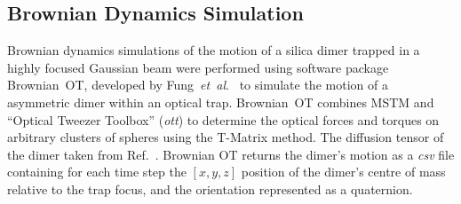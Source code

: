 \documentclass[final,  3p]{elsarticle}
\begin{document}
\subsection{Brownian Dynamics Simulation}
\label{sec:brownian}

Brownian dynamics simulations of the motion of a silica dimer trapped
in a highly focused Gaussian beam were performed using software
package Brownian~OT, developed by Fung~\textit{et~al}.\
\cite{Vigilante2020Brownian_OT} to simulate the motion of a asymmetric
dimer within an optical trap.  Brownian~OT combines MSTM
\cite{Mishchenko1996MSTM} and ``Optical Tweezer Toolbox''
(\textit{ott}) \cite{Lenton2020} to determine the optical forces and
torques on arbitrary clusters of spheres using the T-Matrix method.
%
The diffusion tensor of the dimer taken from Ref.~.
%
%
Brownian OT returns the dimer's motion as a \textit{csv} file
containing for each time step the $[x,y,z]$ position of the dimer's
centre of mass relative to the trap focus, and the orientation
represented as a quaternion.
\end{document}
